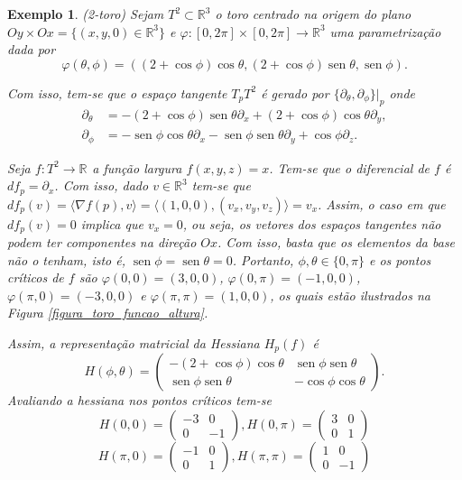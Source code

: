 \documentclass[12pt]{book}
\newtheorem{exemplo}[teorema]{Exemplo}
\DeclareMathOperator{\sen}{sen}
\newcommand{\derivadaparcialabrev}[1]{\partial_{#1}}
\newcommand{\produtointerno}[2]{\langle #1, #2 \rangle}
\newcommand{\real}[1]{\mathbb{R}^{#1}}
\newcommand{\reta}{\real{}}
\begin{document}
	\begin{exemplo}
		(2-toro) Sejam $T^{2} \subset \real{3}$ o toro centrado na origem do plano $Oy\times Ox = \{(x, y ,0) \in \real{3}\}$ e $\varphi:[0,2\pi]\times [0,2\pi] \to \real{3}$ uma parametrização dada por 
		$$
		\varphi(\theta, \phi) = ((2+\cos\phi)\cos\theta, (2+\cos\phi)\sen\theta, \sen\phi).
		$$
		
		Com isso, tem-se que o espaço tangente $T_{p}T^{2} $ é gerado por $ \{\derivadaparcialabrev{\theta}, \derivadaparcialabrev{\phi} \}|_{p}$ onde
		$$
		\begin{aligned}
			\derivadaparcialabrev{\theta} &= -(2+\cos\phi)\sen\theta \derivadaparcialabrev{x}+(2+\cos\phi)\cos\theta \derivadaparcialabrev{y},
			\\
			\derivadaparcialabrev{\phi} &=  - \sen\phi \cos\theta 	\derivadaparcialabrev{x} - \sen\phi \sen\theta 	\derivadaparcialabrev{y} +\cos\phi				\derivadaparcialabrev{z}.
			\end{aligned} 
		$$
				
		Seja $f:T^{2} \to \reta$ a função largura $f(x,y,z)=x$. Tem-se que o diferencial de $f$ é $df_{p} = \derivadaparcialabrev{x}$. Com isso, dado $v \in \real{3}$ tem-se que $df_{p}(v) = \produtointerno{\nabla f(p)}{v}  = \produtointerno{(1,0,0)}{(v_{x}, v_{y}, v_{z})} =v_{x}$. Assim, o caso em que $df_{p}(v) = 0$ implica que $v_{x} = 0$, ou seja, os vetores dos espaços tangentes não podem ter componentes na direção $Ox$. Com isso, basta que os elementos da base não o tenham, isto é, $\sen\phi = \sen\theta = 0$. Portanto, $\phi, \theta \in \{0, \pi\}$ e os pontos críticos de $f$ são $\varphi(0,0) = (3,0,0)$, $\varphi(0,\pi) = (-1,0,0)$, $\varphi(\pi,0) = (-3,0,0)$ e $\varphi(\pi,\pi) = (1,0,0)$, os quais estão ilustrados na Figura \ref{figura_toro_funcao_altura}.
			
		Assim, a representação matricial da Hessiana $H_{p}(f)$ é
			$$
			H(\phi, \theta) = 
			\left(
			\begin{array}{cc}
			-(2+\cos\phi)\cos\theta & \sen\phi \sen\theta  
			\\
			\sen\phi \sen\theta   & -\cos\phi \cos\theta  
			\end{array}
			\right).
			$$
		Avaliando a hessiana nos pontos críticos tem-se
			$$
			H(0, 0) = 
			\left(
			\begin{array}{cc}
			-3 & 0
			\\
			0& -1
			\end{array}
			\right),
			H(0, \pi) = 
			\left(
			\begin{array}{cc}
			3 & 0
			\\
			0& 1
			\end{array}
			\right)
			$$
			$$
			H(\pi, 0) = 
			\left(
			\begin{array}{cc}
			-1 & 0
			\\
			0& 1
			\end{array}
			\right),
			H(\pi, \pi) = 
			\left(
			\begin{array}{cc}
			1 & 0
			\\
			0& -1
			\end{array}
			\right)
			$$
			

\end{exemplo}
\end{document}
